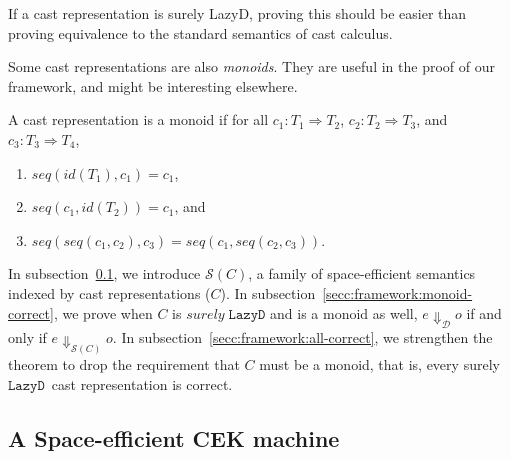 \documentclass[acmsmall,review,anonymous]{acmart}\settopmatter{printfolios=true,printccs=false,printacmref=false}
\newcommand{\lazyD}{$\mathtt{Lazy D}$}
\newcommand{\judgeSeval}[3]{#2 \Downarrow_{\mathcal{S}(#1)} #3}
\newcommand{\judgeDeval}[2]{#1 \Downarrow_{\mathcal{D}} #2}
\newcommand{\effCEK}[1]{$ \mathcal{S}(#1) $}
\begin{document}
If a cast representation is surely LazyD, proving this should be easier than 
proving equivalence to the standard semantics of cast calculus.

Some cast representations are also \textit{monoids}. They are useful in the 
proof of our framework, and might be interesting elsewhere.

\begin{definition}[Monoid]
	A cast representation is a monoid if 
	for all
	$c_1 : T_1 \Longrightarrow T_2$,
	$c_2 : T_2 \Longrightarrow T_3$, and
	$c_3 : T_3 \Longrightarrow T_4$,
	\begin{enumerate}
		\item $seq(id(T_1),c_1) = c_1$,
		\item $seq(c_1,id(T_2)) = c_1$, and
		\item $seq(seq(c_1, c_2), c_3) = seq(c_1, seq(c_2, c_3))$.
	\end{enumerate}
\end{definition}

In subsection~\ref{ssec:framework:cek}, we introduce \effCEK{C}, a family 
of space-efficient semantics indexed by cast representations ($ C $). 
In subsection~\ref{secc:framework:monoid-correct}, we prove when $ C $ is 
$ surely \; \text{\lazyD} $ and is a monoid as well, $ \judgeDeval{e}{o} $ if 
and only if $ \judgeSeval{C}{e}{o} $. In 
subsection~\ref{secc:framework:all-correct}, we strengthen the theorem to drop 
the requirement that $ C $ must be a monoid, that is, every surely \lazyD\ cast 
representation is correct.

\subsection{A Space-efficient CEK machine}
\label{ssec:framework:cek}
\end{document}
